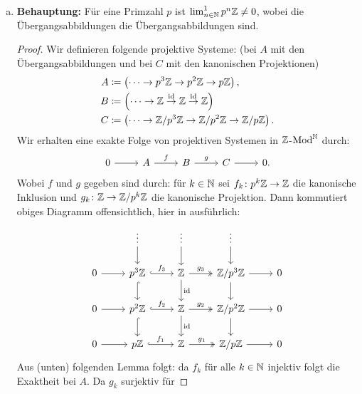 \documentclass{nico_zettelsose21}
\newcommand{\Zpp}[1]{\Z/p^{#1}\Z}
\begin{document}
\begin{enumerate}[(a)]
    \item   \textbf{Behauptung:} Für eine Primzahl $p$ ist $\lim_{n \in \mathbb{N}}^{1} p^{n}\mathbb{Z} \neq 0$, wobei die Übergangsabbildungen 
            die Übergangsabbildungen sind.
            \begin{proof}
                Wir definieren folgende projektive Systeme: (bei $A$ mit den Übergangsabbildungen und bei $C$ mit den kanonischen Projektionen)
                \begin{align*}
                    A &\coloneqq \left( \cdots \rightarrow p^{3}\Z \rightarrow p^{2}\Z \rightarrow p\Z \right), \\
                    B &\coloneqq \left( \cdots \rightarrow \Z \stackrel{\id}{\rightarrow} \Z \stackrel{\id}{\rightarrow} \Z \right) \\
                    C &\coloneqq \left( \cdots \rightarrow \Zpp{3} \rightarrow \Zpp{2} \rightarrow \Z/p\Z \right).
                \end{align*}
                Wir erhalten eine exakte Folge von projektiven Systemen in $\mathbb{Z}$-$\operatorname{Mod}^{\mathbb{N}}$ durch:
                \[
                \begin{tikzcd}
                    0 \arrow[r] &A \arrow[r, "f"] &B \arrow[r, "g"] &C \arrow[r] &0.
                \end{tikzcd}
                \]  
                Wobei $f$ und $g$ gegeben sind durch: für $k \in \mathbb{N}$ sei $f_{k}\colon p^{k}\mathbb{Z} \to \mathbb{Z}$ die kanonische Inklusion und
                $g_{k} \colon \Z \to \Zpp{k}$ die kanonische Projektion. Dann kommutiert obiges Diagramm offensichtlich, hier in ausführlich:
                \[
                \begin{tikzcd}
                    & \vdots \arrow[d] & \vdots \arrow[d] & \vdots \arrow[d] & \\
                    0 \arrow[r] & p^{3}\Z \arrow[r, hookrightarrow, "f_{3}"] \arrow[d, hookrightarrow] & \Z \arrow[r, twoheadrightarrow, "g_{3}"] \arrow[d, "\id"] &\Zpp{3} \arrow[r] \arrow[d] &0 \\
                    0 \arrow[r] & p^{2}\Z \arrow[r, hookrightarrow, "f_{2}"] \arrow[d, hookrightarrow] & \Z \arrow[r, twoheadrightarrow, "g_{2}"] \arrow[d, "\id"] &\Zpp{2} \arrow[r] \arrow[d] &0 \\
                    0 \arrow[r] & p\Z \arrow[r, hookrightarrow, "f_{1}"] & \Z \arrow[r, twoheadrightarrow, "g_{1}"] &\Z/p\Z \arrow[r] &0
                \end{tikzcd}
                \]
                Aus (unten) folgenden Lemma folgt: da $f_{k}$ für alle $k \in \mathbb{N}$ injektiv folgt die Exaktheit bei $A$. Da $g_{k}$ surjektiv für

\end{proof}
\end{enumerate}
\end{document}
